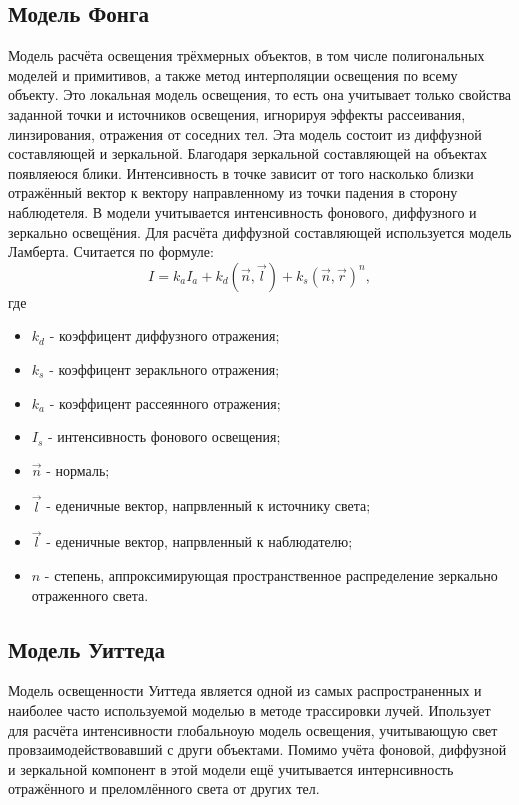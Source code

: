 \documentclass[12pt,a4paper,oneside]{report}
\begin{document}
			\subsection{Модель Фонга}
				\quad Модель расчёта освещения трёхмерных объектов, в том числе полигональных моделей и примитивов, а также метод интерполяции освещения по всему объекту. Это локальная модель освещения, то есть она учитывает только свойства заданной точки и источников освещения, игнорируя эффекты рассеивания, линзирования, отражения от соседних тел. Эта модель состоит из диффузной составляющей и зеркальной. Благодаря зеркальной составляющей на объектах появляеюся блики. Интенсивность в точке зависит от того насколько близки отражённый вектор к вектору направленному из точки падения в сторону наблюдетеля. В модели учитывается интенсивность фонового, диффузного и зеркально освещёния. Для расчёта диффузной составляющей используется модель Ламберта. Считается по формуле:
				\[
					I = k_{a}I_{a} + k_{d}(\vec{n}, \vec{l}) + k_{s}(\vec{n}, \vec{r})^n,
				\]
				\quad где
				\begin{itemize}
					\item $k_{d}$ - коэффицент диффузного отражения;
					\item $k_{s}$ - коэффицент зеракльного отражения;
					\item $k_{a}$ - коэффицент рассеянного отражения;
					\item $I_{s}$ - интенсивность фонового освещения;
					\item $\vec{n}$ -  нормаль;
					\item $\vec{l}$ - еденичные вектор, напрвленный к источнику света;
					\item $\vec{l}$ - еденичные вектор, напрвленный к наблюдателю;
					\item $n$ - степень, аппроксимирующая пространственное распределение зеркально отраженного света.
				\end{itemize}
			\subsection{Модель Уиттеда}
				\quad Модель освещенности Уиттеда является одной из самых распространенных и наиболее часто используемой моделью в методе трассировки лучей. Ипользует для расчёта интенсивности глобальноую модель освещения, учитывающую свет провзаимодействовавший с други объектами. Помимо учёта фоновой, диффузной и зеркальной компонент в этой модели ещё учитывается интернсивность отражённого и преломлённого света от других тел.
\end{document}
